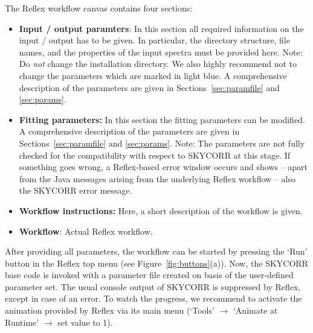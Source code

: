 The Reflex workflow canvas contains four sections:
\begin{itemize}
    \item {\bf Input / output paramters}: In this section all required
information on the input / output has to be given. In particular, the directory
structure, file names, and the properties of the input spectra must be provided
here. Note: Do {\it not} change the installation directory. We also highly
recommend not to change the parameters which are marked in light blue. A
comprehensive description of the parameters are given in
Sections~\ref{sec:paramfile} and \ref{sec:params}.
    \item {\bf Fitting parameters:} In this section the fitting parameters can
be modified. A comprehensive description of the parameters are given in
Sections~\ref{sec:paramfile} and \ref{sec:params}. Note: The parameters are not
fully checked for the compatibility with respect to SKYCORR at this stage. If
something goes wrong, a Reflex-based error window occurs and shows -- apart
from the Java messages arising from the underlying Reflex workflow -- also the
SKYCORR error message.
    \item {\bf Workflow instructions:} Here, a short description of the
workflow is given.
    \item {\bf Workflow}: Actual Reflex workflow.
\end{itemize}

After providing all parameters, the workflow can be started by pressing the
`Run' button in the Reflex top menu (see Figure~\ref{fig:buttons}(a)). Now, the
SKYCORR base code is invoked with a parameter file created on basis of the
user-defined parameter set. The usual console output of SKYCORR is suppressed
by Reflex, except in case of an error. To watch the progress, we recommend to
activate the animation provided by Reflex via its main menu (`Tools'
$\rightarrow$ `Animate at Runtime' $\rightarrow$ set value to 1).

